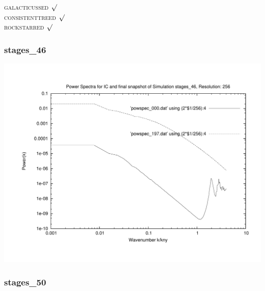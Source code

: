 \textsc{galacticussed} $\surd$ \\
\textsc{consistenttreed} $\surd$ \\ 
\textsc{rockstarred} $\surd$


% 
%
%
%
%
%
%
%


\newpage
\subsubsection{stages\_46}

\includegraphics[scale=0.5]{r256/h100/stages_46/plot_powspec_stages_46}


% 
%
%
%
%
%
%
%


\newpage
\subsubsection{stages\_50}

